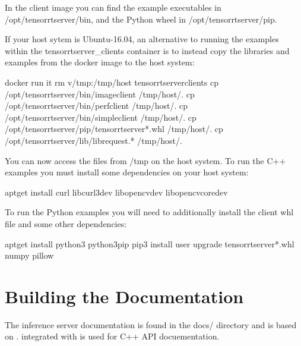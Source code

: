 \documentclass[letterpaper,10pt,english]{sphinxmanual}
\begin{document}
In the client image you can find the example executables in
/opt/tensorrtserver/bin, and the Python wheel in
/opt/tensorrtserver/pip.

If your host sytem is Ubuntu-16.04, an alternative to running the
examples within the tensorrtserver\_clients container is to instead
copy the libraries and examples from the docker image to the host
system:

\begin{sphinxVerbatim}[commandchars=\\\{\}]
\PYGZdl{} docker run \PYGZhy{}it \PYGZhy{}\PYGZhy{}rm \PYGZhy{}v/tmp:/tmp/host tensorrtserver\PYGZus{}clients
\PYGZsh{} cp /opt/tensorrtserver/bin/image\PYGZus{}client /tmp/host/.
\PYGZsh{} cp /opt/tensorrtserver/bin/perf\PYGZus{}client /tmp/host/.
\PYGZsh{} cp /opt/tensorrtserver/bin/simple\PYGZus{}client /tmp/host/.
\PYGZsh{} cp /opt/tensorrtserver/pip/tensorrtserver\PYGZhy{}*.whl /tmp/host/.
\PYGZsh{} cp /opt/tensorrtserver/lib/librequest.* /tmp/host/.
\end{sphinxVerbatim}

You can now access the files from /tmp on the host system. To run the
C++ examples you must install some dependencies on your host system:

\begin{sphinxVerbatim}[commandchars=\\\{\}]
\PYGZdl{} apt\PYGZhy{}get install curl libcurl3\PYGZhy{}dev libopencv\PYGZhy{}dev libopencv\PYGZhy{}core\PYGZhy{}dev
\end{sphinxVerbatim}

To run the Python examples you will need to additionally install the
client whl file and some other dependencies:

\begin{sphinxVerbatim}[commandchars=\\\{\}]
\PYGZdl{} apt\PYGZhy{}get install python3 python3\PYGZhy{}pip
\PYGZdl{} pip3 install \PYGZhy{}\PYGZhy{}user \PYGZhy{}\PYGZhy{}upgrade tensorrtserver\PYGZhy{}*.whl numpy pillow
\end{sphinxVerbatim}


\section{Building the Documentation}
\label{\detokenize{build:building-the-documentation}}
The inference server documentation is found in the docs/ directory and
is based on .  integrated with  is used for C++ API
docuementation.
\end{document}
